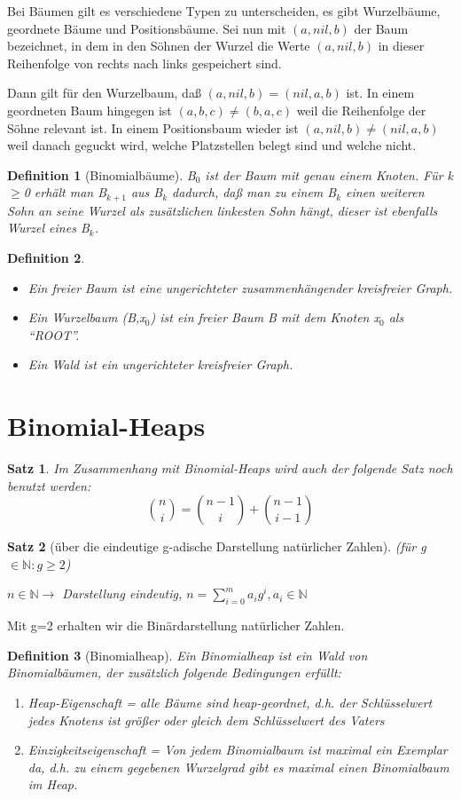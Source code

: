 \documentclass[ngerman,draft,parskip=half*,twoside]{scrreprt}
\theoremstyle{break}
\newtheorem{definition}{Definition}
\newtheorem{satz}{Satz}
\begin{document}
Bei Bäumen gilt es verschiedene Typen zu unterscheiden, es gibt Wurzelbäume, geordnete Bäume und Positionsbäume.
Sei nun mit $(a,nil,b)$ der Baum bezeichnet, in dem in den Söhnen der Wurzel die Werte $(a,nil,b)$ in dieser Reihenfolge von rechts nach
links gespeichert sind.

Dann gilt für den Wurzelbaum, daß $(a,nil,b)=(nil,a,b)$ ist. In einem geordneten Baum hingegen ist
$(a,b,c)\not=(b,a,c)$ weil die Reihenfolge der Söhne relevant ist. In einem Positionsbaum wieder ist
$(a,nil,b)\not=(nil,a,b)$ weil danach geguckt wird, welche Platzstellen belegt sind und welche nicht.

\begin{definition}[Binomialbäume]
B$_0$ ist der Baum mit genau einem Knoten. Für k$\geq$0 erhält man B$_{k+1}$ aus B$_k$ dadurch, daß man zu einem
B$_k$ einen weiteren Sohn an seine Wurzel als zusätzlichen linkesten Sohn hängt, dieser ist ebenfalls Wurzel eines
B$_k$.
\end{definition}

\begin{definition}
\begin{itemize}
\item Ein freier Baum ist eine ungerichteter zusammenhängender kreisfreier Graph.
\item Ein Wurzelbaum (B,x$_0$) ist ein freier Baum B mit dem Knoten x$_0$ als "`ROOT"'.
\item Ein Wald ist ein ungerichteter kreisfreier Graph. 
\end{itemize}
\end{definition}

\section{Binomial-Heaps}  
\begin{satz}
Im Zusammenhang mit Binomial-Heaps wird auch der folgende Satz noch benutzt werden:
\[\binom{n}{i}=\binom{n-1}{i}+\binom{n-1}{i-1}\]
\end{satz}

\begin{satz}[über die eindeutige g-adische Darstellung natürlicher Zahlen]
(für g $\in \mathbb{N} : g\geq 2$)

$n \in \mathbb{N} \rightarrow$ Darstellung eindeutig, $n=\sum_{i=0}^m a_i g^i, a_i \in \mathbb{N}$
\end{satz}
Mit g=2 erhalten wir die Binärdarstellung natürlicher Zahlen.

\begin{definition}[Binomialheap]  
Ein Binomialheap ist ein Wald von Binomialbäumen, der zusätzlich folgende Bedingungen erfüllt:
\begin{enumerate}
\item Heap-Eigenschaft = alle Bäume sind heap-geordnet, d.h. der Schlüsselwert jedes Knotens ist größer oder gleich dem
Schlüsselwert des Vaters
\item Einzigkeitseigenschaft = Von jedem Binomialbaum ist maximal ein Exemplar da, d.h. zu einem gegebenen Wurzelgrad
gibt es maximal einen Binomialbaum im Heap.
\end{enumerate}
\end{definition}
\end{document}

